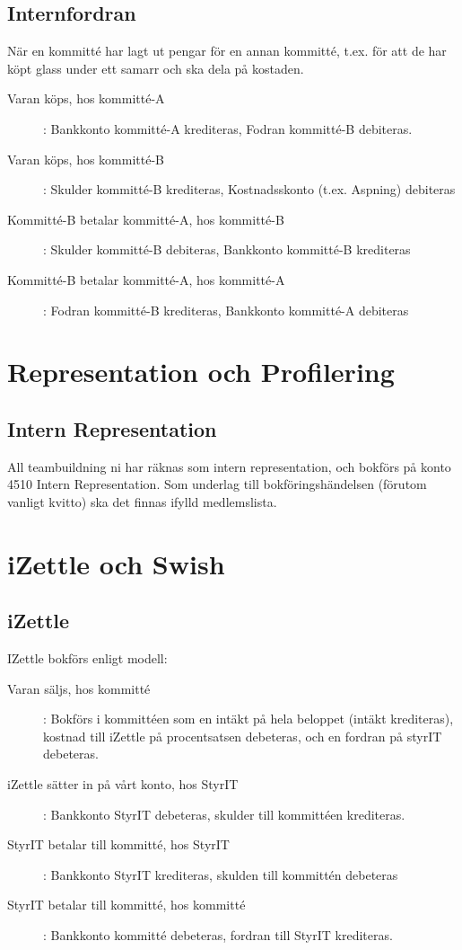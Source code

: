 \documentclass{article}
\begin{document}
\subsection{Internfordran}
När en kommitté har lagt ut pengar för en annan kommitté, t.ex. för att de har köpt glass under ett samarr och ska dela på kostaden.
\begin{description}
   \item [Varan köps, hos kommitté-A]: Bankkonto kommitté-A krediteras, Fodran kommitté-B debiteras.
   \item [Varan köps, hos kommitté-B]: Skulder kommitté-B krediteras, Kostnadsskonto (t.ex. Aspning) debiteras
   \item [Kommitté-B betalar kommitté-A, hos kommitté-B]: Skulder kommitté-B debiteras, Bankkonto kommitté-B krediteras
   \item [Kommitté-B betalar kommitté-A, hos kommitté-A]: Fodran kommitté-B krediteras, Bankkonto kommitté-A debiteras
\end{description}

\section{Representation och Profilering}
\subsection{Intern Representation}
All teambuildning ni har räknas som intern representation, och bokförs på konto 4510 Intern Representation. Som underlag till bokföringshändelsen (förutom vanligt kvitto) ska det finnas ifylld medlemslista. 

\section{iZettle och Swish}
\subsection{iZettle}
IZettle bokförs enligt modell: 
\begin{description}
    \item [Varan säljs, hos kommitté]: Bokförs i kommittéen som en intäkt på hela beloppet (intäkt krediteras), kostnad till iZettle på procentsatsen debeteras, och en fordran på styrIT debeteras. 
    \item [iZettle sätter in på vårt konto, hos StyrIT]: Bankkonto StyrIT debeteras, skulder till kommittéen krediteras. 
    \item [StyrIT betalar till kommitté, hos StyrIT]: Bankkonto StyrIT krediteras, skulden till kommittén debeteras
    \item [StyrIT betalar till kommitté, hos kommitté]: Bankkonto kommitté debeteras, fordran till StyrIT krediteras.
\end{description}
\end{document}

